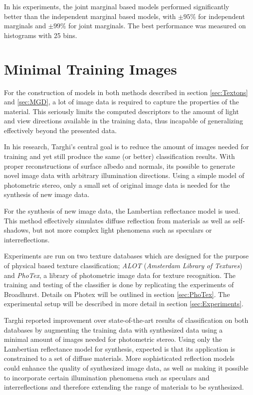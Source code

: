 In his experiments, the joint marginal based models performed significantly better than the independent marginal based models, with $\pm 95\%$ for independent marginals and $\pm 99\%$ for joint marginals. The best performance was measured on histograms with 25 bins. 

\section{Minimal Training Images}\label{sec:Minimal}

For the construction of models in both methods described in section \ref{sec:Textons} and \ref{sec:MGD}, a lot of image data is required to capture the properties of the material. This seriously limits the computed descriptors to the amount of light and view directions available in the training data, thus incapable of generalizing effectively beyond the presented data.

In his research, Targhi's central goal is to reduce the amount of images needed for training and yet still produce the same (or better) classification results. With proper reconstructions of surface albedo and normals, its possible to generate novel image data with arbitrary illumination directions. Using a simple model of photometric stereo, only a small set of original image data is needed for the synthesis of new image data.

For the synthesis of new image data, the Lambertian reflectance model is used. This method effectively simulates diffuse reflection from materials as well as self-shadows, but not more complex light phenomena such as speculars or interreflections. 

Experiments are run on two texture databases which are designed for the purpose of physical based texture classification; \textit{ALOT} (\textit{Amsterdam Library of Textures}) and \textit{PhoTex}, a library of photometric image data for texture recognition. The training and testing of the classifier is done by replicating the experiments of Broadhurst. Details on Photex will be outlined in section \ref{sec:PhoTex}. The experimental setup will be described in more detail in section \ref{sec:Experiments}.

Targhi reported improvement over state-of-the-art results of classification on both databases by augmenting the training data with synthesized data using a minimal amount of images needed for photometric stereo. Using only the Lambertian reflectance model for synthesis, expected is that its application is constrained to a set of diffuse materials. More sophisticated reflection models could enhance the quality of synthesized image data, as well as making it possible to incorporate certain illumination phenomena such as speculars and interreflections and therefore extending the range of materials to be synthesized.

